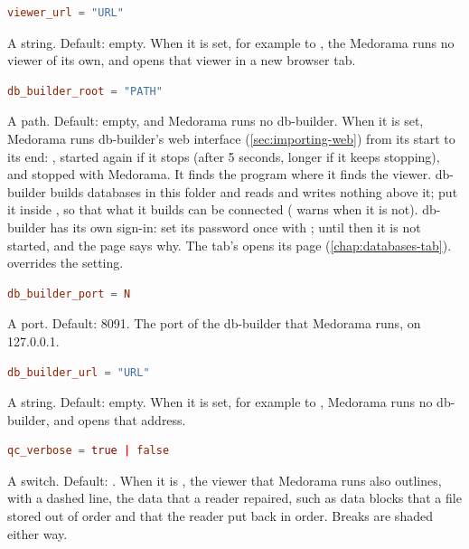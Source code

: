\begin{lstlisting}[style=signature,language=TOML]
viewer_url = "URL"
\end{lstlisting}
A string. Default: empty. When it is set, for example to , the
Medorama runs no viewer of its own, and  opens that viewer in a new browser tab.

\begin{lstlisting}[style=signature,language=TOML]
db_builder_root = "PATH"
\end{lstlisting}
A path. Default: empty, and Medorama runs no db-builder. When it is set, Medorama runs
db-builder's web interface (\cref{sec:importing-web}) from its start to its end:
,
started again if it stops (after 5 seconds, longer if it keeps stopping), and stopped with
Medorama. It finds the  program where it finds the viewer. db-builder builds
databases in this folder and reads and writes nothing above it; put it inside ,
so that what it builds can be connected ( warns when it is not). db-builder
has its own sign-in: set its password once with ; until then it is not started, and the page says why. The 
tab's  opens its page (\cref{chap:databases-tab}).
 overrides the setting.

\begin{lstlisting}[style=signature,language=TOML]
db_builder_port = N
\end{lstlisting}
A port. Default: 8091. The port of the db-builder that Medorama runs, on 127.0.0.1.

\begin{lstlisting}[style=signature,language=TOML]
db_builder_url = "URL"
\end{lstlisting}
A string. Default: empty. When it is set, for example to , Medorama
runs no db-builder, and  opens that address.

\begin{lstlisting}[style=signature,language=TOML]
qc_verbose = true | false
\end{lstlisting}
A switch. Default: . When it is , the viewer that Medorama runs also
outlines, with a dashed line, the data that a reader repaired, such as data blocks that a file
stored out of order and that the reader put back in order. Breaks are shaded either way.

